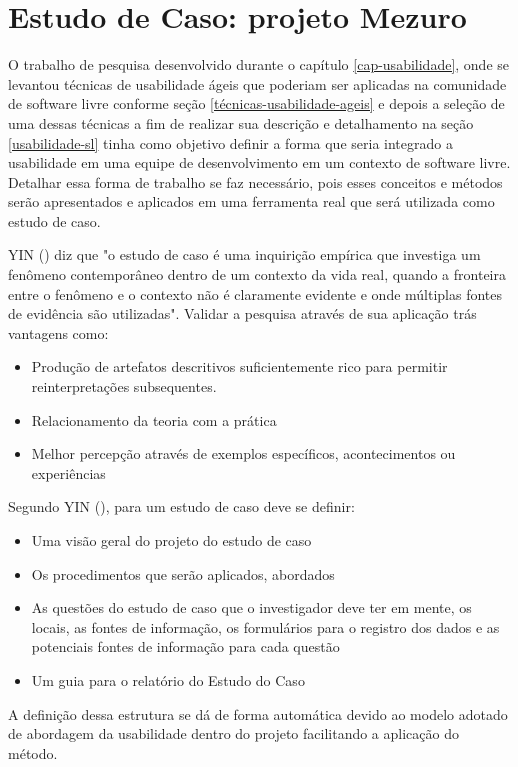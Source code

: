 \chapter{Estudo de Caso: projeto Mezuro}
\label{cap-estudo-caso}

O trabalho de pesquisa desenvolvido durante o capítulo \ref{cap-usabilidade}, onde se levantou técnicas de usabilidade ágeis que poderiam ser aplicadas na comunidade de software livre conforme seção \ref{técnicas-usabilidade-ageis} e depois a seleção de uma dessas técnicas a fim de realizar sua descrição e detalhamento na seção \ref{usabilidade-sl} tinha como objetivo definir a forma que seria integrado a usabilidade em uma equipe de desenvolvimento em um contexto de software livre. Detalhar essa forma de trabalho se faz necessário, pois esses conceitos e métodos serão apresentados e aplicados em uma ferramenta real que será utilizada como estudo de caso.

%
YIN (\citeyear{yin2009}) diz que "o estudo de caso é uma inquirição empírica que investiga um fenômeno contemporâneo dentro de um contexto da vida real, quando a fronteira entre o fenômeno e o contexto não é claramente evidente e onde múltiplas fontes de evidência são utilizadas".
Validar a pesquisa através de sua aplicação trás vantagens como:
\begin{itemize}
\item Produção de artefatos descritivos suficientemente rico para permitir reinterpretações subsequentes.
\item Relacionamento da teoria com a prática
\item Melhor percepção através de exemplos específicos, acontecimentos ou experiências
\end{itemize}

%
Segundo YIN (\citeyear{yin2009}), para um estudo de caso deve se definir:
\begin{itemize}
\item Uma visão geral do projeto do estudo de caso
\item Os procedimentos que serão aplicados, abordados
\item As questões do estudo de caso que o investigador deve ter em mente, os locais, as fontes de informação, os formulários para o registro dos dados e as potenciais fontes de informação para cada questão
\item Um guia para o relatório do Estudo do Caso
\end{itemize}

%
A definição dessa estrutura se dá de forma automática devido ao modelo adotado de abordagem da usabilidade dentro do projeto facilitando a aplicação do método.

